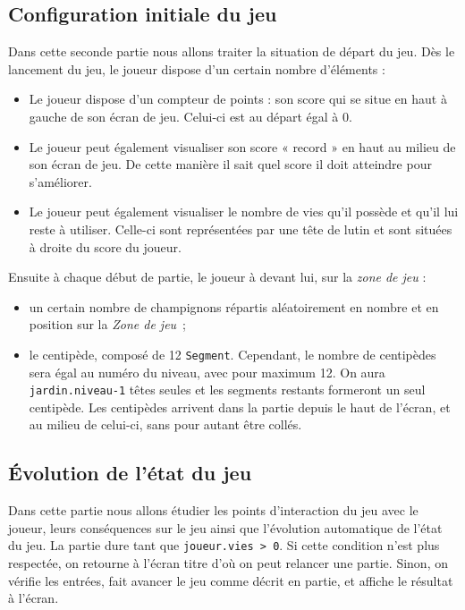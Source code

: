 \subsection{Configuration initiale du jeu}
Dans cette seconde partie nous allons traiter la situation de départ du jeu. Dès le lancement du jeu, le joueur dispose d'un certain nombre d'éléments : 

\begin{itemize}
	\item Le joueur dispose d'un compteur de points : son score qui se situe en haut à gauche de son écran de jeu. Celui-ci est au départ égal à 0.
	\item Le joueur peut également visualiser son score « record » en haut au milieu de son écran de jeu. De cette manière il sait quel score il doit atteindre pour s'améliorer.
	\item Le joueur peut également visualiser le nombre de vies qu'il possède et qu'il lui reste à utiliser. Celle-ci sont représentées par une tête de lutin et sont situées à droite du score du joueur.
\end{itemize}

Ensuite à chaque début de partie, le joueur à devant lui, sur la \emph{zone de jeu} : 

\begin{itemize}
	\item un certain nombre de champignons répartis aléatoirement en nombre et en position sur la  \emph{Zone de jeu}~;
	\item le centipède, composé de 12 \texttt{Segment}. Cependant, le nombre de centipèdes sera égal au numéro du niveau, avec pour maximum 12. On aura \texttt{jardin.niveau-1} têtes seules et les segments restants formeront un seul centipède. Les centipèdes arrivent dans la partie depuis le haut de l'écran, et au milieu de celui-ci, sans pour autant être collés.
\end{itemize}
 

\subsection{Évolution de l'état du jeu}

Dans cette partie nous allons étudier les points d'interaction du jeu avec le joueur, leurs conséquences sur le jeu ainsi que l'évolution automatique de l'état du jeu. La partie dure tant que \texttt{joueur.vies > 0}. Si cette condition n'est plus respectée, on retourne à l'écran titre d'où on peut relancer une partie. Sinon, on vérifie les entrées, fait avancer le jeu comme décrit en partie, et affiche le résultat à l'écran.

